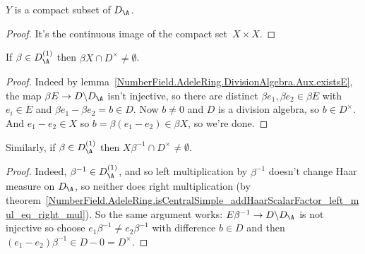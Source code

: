 \begin{lemma}
  \label{NumberField.AdeleRing.DivisionAlgebra.Aux.Y_compact}
  \leanok
  $Y$ is a compact subset of $D_{\A}$.
\end{lemma}
\begin{proof}
  \leanok
  It's the continuous image of the compact set~$X\times X$.
\end{proof}

\begin{lemma}
  \label{NumberField.AdeleRing.DivisionAlgebra.Aux.X_meets_kernel}
  \leanok
  If $\beta\in D_{\A}^{(1)}$ then
$\beta X\cap D^\times\not=\emptyset$.
\end{lemma}
\begin{proof}
  \leanok
Indeed by lemma~\ref{NumberField.AdeleRing.DivisionAlgebra.Aux.existsE},
the map $\beta E\to D\backslash D_{\A}$
isn't injective, so there are distinct
$\beta e_1,\beta e_2\in \beta E$ with $e_i\in E$ and
$\beta e_1-\beta e_2=b\in D$.
Now $b\not=0$ and $D$ is a division algebra, so $b\in D^\times$.
And $e_1-e_2\in X$ so $b=\beta(e_1-e_2)\in \beta X$, so we're done.
\end{proof}

\begin{lemma}
  \label{NumberField.AdeleRing.DivisionAlgebra.Aux.X_meets_kernel'}
  \leanok
  Similarly, if $\beta\in D_{\A}^{(1)}$ then
  $X\beta^{-1}\cap D^\times\not=\emptyset$.
\end{lemma}
\begin{proof}
  \leanok
  Indeed, $\beta^{-1}\in D_{\A}^{(1)}$, and so left multiplication by $\beta^{-1}$
  doesn't change Haar measure on $D_{\A}$, so neither does right multiplication
  (by theorem~\ref{NumberField.AdeleRing.isCentralSimple_addHaarScalarFactor_left_mul_eq_right_mul}).
  So the same argument works: $E\beta^{-1}\to D\backslash D_{\A}$ is not
  injective so choose $e_1\beta^{-1}\not=e_2\beta^{-1}$ with difference $b\in D$
  and then $(e_1-e_2)\beta^{-1}\in D-{0}=D^\times$.
\end{proof}

